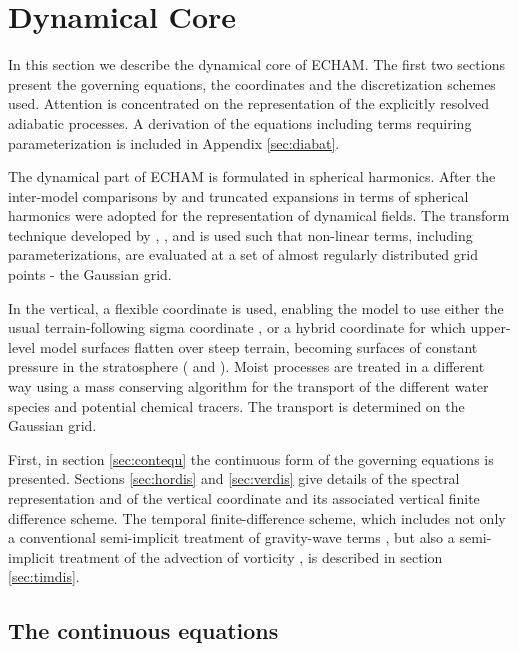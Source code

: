 \section{Dynamical Core}\label{sec:dyncore}

In this section we describe the dynamical core of ECHAM. The first two sections present the governing equations,
the coordinates and the discretization schemes used. Attention is
concentrated on the representation of the explicitly resolved
adiabatic processes. A derivation of the equations including terms
requiring parameterization is included in Appendix \ref{sec:diabat}.

The dynamical part of ECHAM is formulated in spherical
harmonics. After the inter-model comparisons by \cite{jarraud81} and
\cite{girard82} truncated expansions in terms of spherical harmonics
were adopted for the representation of dynamical fields. The transform
technique developed by \cite{eliasen70}, \cite{orszag70}, and
\cite{machenhauer72} is used such that non-linear terms, including
parameterizations, are evaluated at a set of almost regularly
distributed grid points - the Gaussian grid.

In the vertical, a flexible coordinate is used, enabling the model to
use either the usual terrain-following sigma coordinate
\cite[]{phillips57}, or a hybrid coordinate for which upper-level model
surfaces flatten over steep terrain, becoming surfaces of constant
pressure in the stratosphere (\cite{simmons81a} and
\cite{simmons81b}). Moist processes are treated in a different way using 
a mass conserving algorithm for the transport \cite[]{lin96} of the
different water species and potential chemical tracers. The transport
is determined on the Gaussian grid.

First, in section \ref{sec:contequ} the continuous form of the
governing equations is presented. Sections \ref{sec:hordis} and
\ref{sec:verdis} give details of the spectral representation and of
the vertical coordinate and its associated vertical finite difference
scheme. The temporal finite-difference scheme, which includes not only
a conventional semi-implicit treatment of gravity-wave terms
\cite[]{robert72}, but also a semi-implicit treatment of the advection
of vorticity \cite[]{jarraud82}, is described in section
\ref{sec:timdis}.

\subsection{\label{sec:contequ}The continuous equations} 

